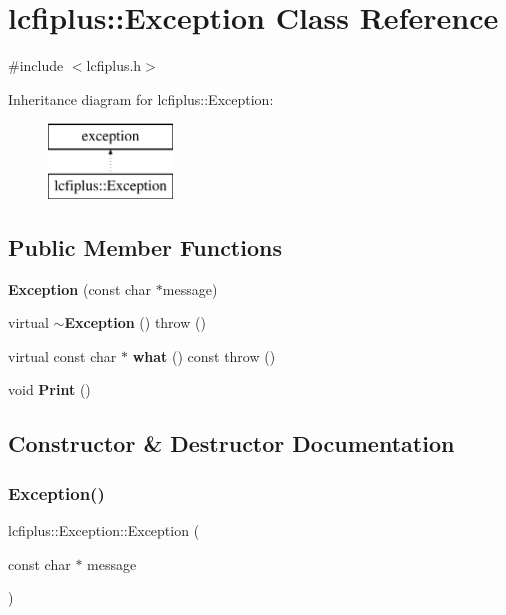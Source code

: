 \section{lcfiplus\+:\+:Exception Class Reference}
\label{classlcfiplus_1_1Exception}


{\ttfamily \#include $<$lcfiplus.\+h$>$}

Inheritance diagram for lcfiplus\+:\+:Exception\+:\begin{figure}[H]
\begin{center}
\leavevmode
\includegraphics[height=2.000000cm]{classlcfiplus_1_1Exception}
\end{center}
\end{figure}
\subsection*{Public Member Functions}
\begin{DoxyCompactItemize}
\item 
\textbf{ Exception} (const char $\ast$message)
\item 
virtual \textbf{ $\sim$\+Exception} ()  throw ()
\item 
virtual const char $\ast$ \textbf{ what} () const  throw ()
\item 
void \textbf{ Print} ()
\end{DoxyCompactItemize}


\subsection{Constructor \& Destructor Documentation}
\mbox{\label{classlcfiplus_1_1Exception_a32454774b1d656e6122afaac99d5e74c}} 
\subsubsection{Exception()}
{\footnotesize\ttfamily lcfiplus\+::\+Exception\+::\+Exception (\begin{DoxyParamCaption}\item[{const char $\ast$}]{message }\end{DoxyParamCaption})\hspace{0.3cm}{\ttfamily [inline]}}


